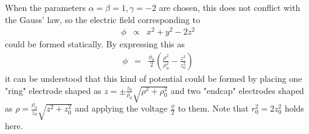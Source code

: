 \documentclass{jarticle}
\begin{document}
When the parameters $\alpha = \beta = 1, \gamma = -2$ are chosen, this does not conflict with the Gauss' law, so the electric field corresponding to
\begin{eqnarray*}
\phi & \propto & x^2 + y^2 - 2z^2
\end{eqnarray*}
could be formed statically. By expressing this as
\begin{eqnarray*}
\phi & = & \frac{\phi_0}{2} \left( \frac{\rho^2}{\rho_0^2} - \frac{z^2}{z_0^2} \right)
\end{eqnarray*}
it can be understood that this kind of potential could be formed by placing one "ring" electrode shaped as $z = \pm \frac{z_0}{\rho_0}\sqrt{ \rho^2 + \rho_0^2}$ and two "endcap" electrodes shaped as $\rho = \frac{\rho_0}{z_0}\sqrt{z^2 + z_0^2}$ and applying the voltage $\frac{\phi}{2}$ to them. Note that $r_0^2 = 2z_0^2$ holds here.


\begin{thebibliography}{9}

\end{thebibliography}
\end{document}
